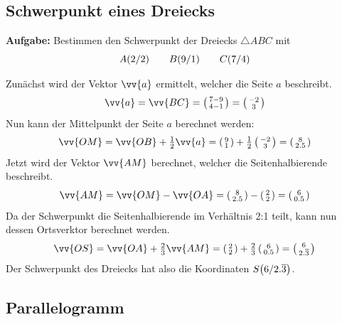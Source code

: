 \subsection{Schwerpunkt eines Dreiecks}
\textbf{Aufgabe:} Bestimmen den Schwerpunkt der Dreiecks $\triangle ABC$ mit
\[
  \coord[A]{2,2} \qquad \coord[B]{9,1} \qquad \coord[C]{7,4}
\]
\begin{center}
\end{center}
Zunächst wird der Vektor $\vv{a}$ ermittelt, welcher die Seite $a$ beschreibt.
\[
  \vv{a} = \vv{BC} = \tvec{7-9,4-1} = \tvec{-2,3}
\]
Nun kann der Mittelpunkt der Seite $a$ berechnet werden:
\[
  \vv{OM} = \vv{OB}+\tfrac{1}{2}\vv{a} = \tvec{9,1}+\tfrac{1}{2}\tvec{-2,3} = \tvec{8,2.5}
\]
Jetzt wird der Vektor $\vv{AM}$ berechnet, welcher die Seitenhalbierende beschreibt.
\[
  \vv{AM} = \vv{OM}-\vv{OA} = \tvec{8,2.5}-\tvec{2,2} = \tvec{6,0.5}
\]
Da der Schwerpunkt die Seitenhalbierende im Verhältnis 2:1 teilt, kann nun dessen Ortsverktor berechnet werden.
\[
  \vv{OS} = \vv{OA}+\tfrac{2}{3}\vv{AM} = \tvec{2,2}+\tfrac{2}{3}\tvec{6,0.5} = \tvec{6,2.\overline{3}}
\]
Der Schwerpunkt des Dreiecks hat also die Koordinaten
$\coord[S]{6,2.\overline{3}}$.
\newpage
\subsection{Parallelogramm}

